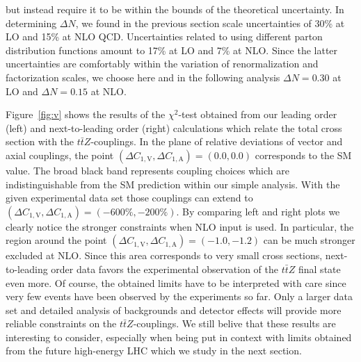 \documentclass[preprint]{JHEP3}
\def\ttbZ{t\bar{t}Z}
\def\DConeA{\Delta C_{1,\mathrm{A}}}
\def\DConeV{\Delta C_{1,\mathrm{V}}}
\begin{document}
but instead require it to be within the bounds of the theoretical uncertainty. 
In determining $\Delta N$, we found in the previous section scale uncertainties of 30\% at LO and 15\% at NLO QCD.
Uncertainties related to using different parton distribution functions amount to 17\% at LO and 7\% at NLO. 
Since the latter uncertainties are comfortably within the variation of renormalization and factorization scales, we 
choose here and in the following analysis $\Delta N = 0.30$ at LO and $\Delta N = 0.15$ at NLO.

Figure~\ref{fig:v} shows the results of the $\chi^2$-test obtained from our leading order (left) and next-to-leading order (right) calculations
which relate the total cross section with the $\ttbZ$-couplings.
In the plane of relative deviations of vector and axial couplings, the point $(\DConeV,\DConeA)=(0.0,0.0)$ corresponds to the SM value.
The broad black band represents coupling choices which are indistinguishable from the SM prediction within our simple analysis.
With the given experimental data set those couplings can extend to $(\DConeV,\DConeA)=(-600\%,-200\%)$.
By comparing left and right plots we clearly notice the stronger constraints when NLO input is used.
In particular, the region around the point $(\DConeV,\DConeA)=(-1.0,-1.2)$ can be much stronger excluded at NLO. 
Since this area corresponds to very small cross sections, next-to-leading order data favors the experimental observation of the $\ttbZ$ final state even more.
Of course, the obtained limits have to be interpreted with care since very few events have been observed by the experiments so far.
Only a larger data set and detailed analysis of backgrounds and detector effects will provide more reliable constraints on the $\ttbZ$-couplings.
We still belive that these results are interesting to consider, especially when being put in context with limits
obtained from the future high-energy LHC which we study in the next section.
\end{document}
